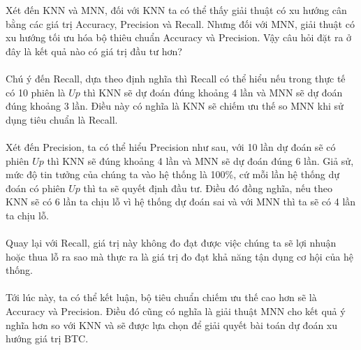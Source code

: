 Xét đến KNN và MNN, đối với KNN ta có thể thấy giải thuật có xu hướng cân bằng 
các giá trị Accuracy, Precision và Recall. Nhưng đối với MNN, giải thuật có xu 
hướng tối ưu hóa bộ thiêu chuẩn Accuracy và Precision. Vậy câu hỏi đặt ra ở đây 
là kết quả nào có giá trị đầu tư hơn?\\\\
Chú ý đến Recall, dựa theo định nghĩa thì Recall có thể hiểu nếu trong thực tế 
có 10 phiên là $Up$ thì KNN sẽ dự đoán đúng khoảng 4 lần và MNN sẽ dự đoán đúng 
khoảng 3 lần. Điều này có nghĩa là KNN sẽ chiếm ưu thế so MNN khi sử dụng tiêu 
chuẩn là Recall.\\\\
Xét đến Precision, ta có thể hiểu Precision như sau, với 10 lần dự đoán sẽ có 
phiên $Up$ thì KNN sẽ đúng khoảng 4 lần và MNN sẽ dự đoán đúng 6 lần. Giả sử, 
mức độ tin tưởng của chúng ta vào hệ thống là 100\%, cứ mỗi lần hệ thống dự 
đoán có phiên $Up$ thì ta sẽ quyết định đầu tư. Điều đó đồng nghĩa, nếu theo 
KNN sẽ có 6 lần ta chịu lỗ vì hệ thống dự đoán sai và với MNN thì ta sẽ có 4 
lần ta chịu lỗ.\\\\
Quay lại với Recall, giá trị này không đo đạt được việc chúng ta sẽ lợi nhuận 
hoặc thua lỗ ra sao mà thực ra là giá trị đo đạt khả năng tận dụng cơ hội của 
hệ thống.\\\\
Tới lúc này, ta có thể kết luận, bộ tiêu chuẩn chiếm ưu thế cao hơn sẽ là Accuracy 
và Precision. Điều đó cũng có nghĩa là giải thuật MNN cho kết quả ý nghĩa hơn so 
với KNN và sẽ được lựa chọn để giải quyết bài toán dự đoán xu hướng giá trị BTC.